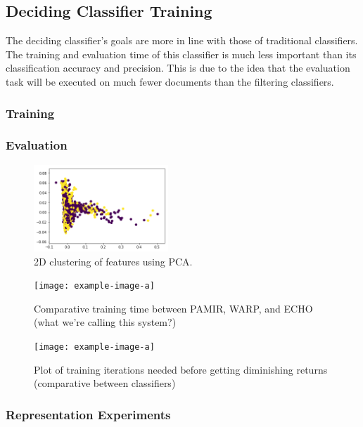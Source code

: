 \subsection{Deciding Classifier Training}
The deciding classifier's goals are more in line with those of traditional classifiers. The training and evaluation time of this classifier is much less important than its classification accuracy and precision. This is due to the idea that the evaluation task will be executed on much fewer documents than the filtering classifiers.

\subsubsection{Training}

\subsubsection{Evaluation}

\begin{figure}[h]
    \centering
    \includegraphics[width=0.45\textwidth]{figures/pca-cluster-hl.png}
    \caption{2D clustering of features using PCA.}
    \label{fig:pcahl}
\end{figure}


\begin{figure}
    \centering
    \texttt{[image: example-image-a]}
    \caption{Comparative training time between PAMIR, WARP, and ECHO (what we're calling this system?)}
    \label{fig:my-label}
\end{figure}

\begin{figure}
    \centering
    \texttt{[image: example-image-a]}
    \caption{Plot of training iterations needed before getting diminishing returns (comparative between classifiers)}
    \label{fig:learning-curve}
\end{figure}

\subsubsection{Representation Experiments}

